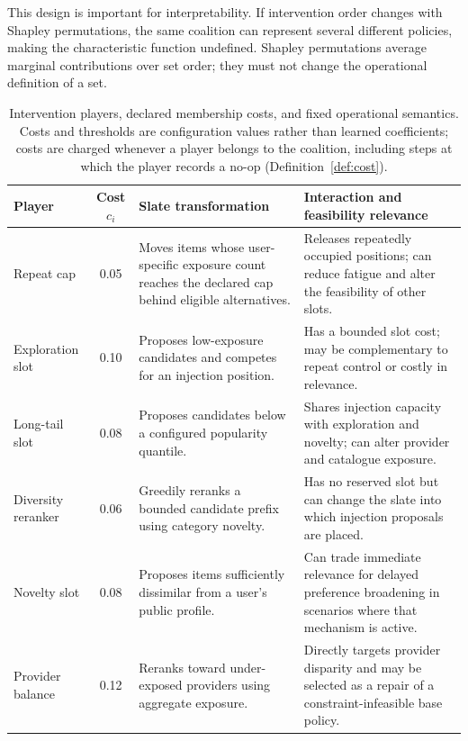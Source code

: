 \documentclass[review]{elsarticle}
\theoremstyle{plain}
\theoremstyle{definition}
\theoremstyle{remark}
\begin{document}
This design is important for interpretability. If intervention order changes with Shapley permutations, the same coalition can represent several different policies, making the characteristic function undefined. Shapley permutations average marginal contributions over set order; they must not change the operational definition of a set.

\begin{table}[t]
\caption{Intervention players, declared membership costs, and fixed operational semantics. Costs and thresholds are configuration values rather than learned coefficients; costs are charged whenever a player belongs to the coalition, including steps at which the player records a no-op (Definition~\ref{def:cost}).}\label{tab:players}
\centering
\small
\setlength{\tabcolsep}{3pt}
\begin{tabularx}{\textwidth}{@{}p{}c X X@{}}
\toprule
Player & Cost $c_i$ & Slate transformation & Interaction and feasibility relevance\\
\midrule
Repeat cap & 0.05 & Moves items whose user-specific exposure count reaches the declared cap behind eligible alternatives. & Releases repeatedly occupied positions; can reduce fatigue and alter the feasibility of other slots.\\
Exploration slot & 0.10 & Proposes low-exposure candidates and competes for an injection position. & Has a bounded slot cost; may be complementary to repeat control or costly in relevance.\\
Long-tail slot & 0.08 & Proposes candidates below a configured popularity quantile. & Shares injection capacity with exploration and novelty; can alter provider and catalogue exposure.\\
Diversity reranker & 0.06 & Greedily reranks a bounded candidate prefix using category novelty. & Has no reserved slot but can change the slate into which injection proposals are placed.\\
Novelty slot & 0.08 & Proposes items sufficiently dissimilar from a user's public profile. & Can trade immediate relevance for delayed preference broadening in scenarios where that mechanism is active.\\
Provider balance & 0.12 & Reranks toward under-exposed providers using aggregate exposure. & Directly targets provider disparity and may be selected as a repair of a constraint-infeasible base policy.\\
\bottomrule
\end{tabularx}
\end{table}
\end{document}
